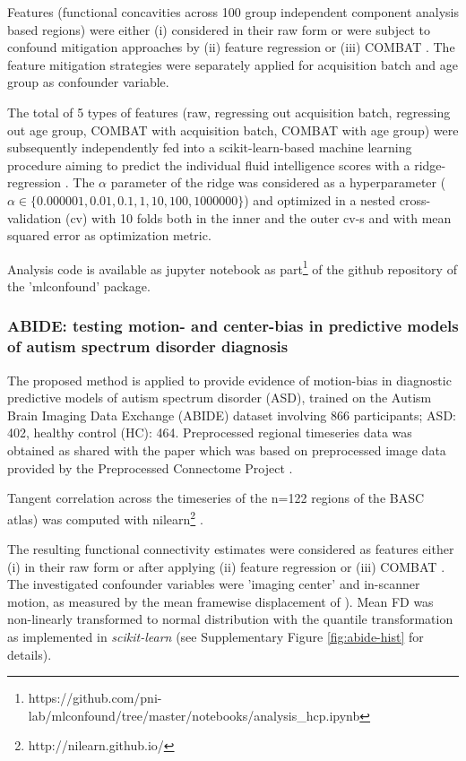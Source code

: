 \documentclass{article}
\begin{document}
Features (functional concavities across 100 group independent component analysis based regions) were either (i) considered in their raw form or were subject to confound mitigation approaches by (ii) feature regression \citep{rao2017predictive} or (iii) COMBAT \citep{johnson2007adjusting, fortin2018harmonization}.
The feature mitigation strategies were separately applied for acquisition batch and age group as confounder variable.

The total of 5 types of features (raw, regressing out acquisition batch, regressing out age group, COMBAT with acquisition batch, COMBAT with age group) were subsequently independently fed into a scikit-learn-based \citep{pedregosa2011scikit} machine learning procedure aiming to predict the individual fluid intelligence scores with a ridge-regression \citep{hoerl1970ridge}. The $\alpha$ parameter of the ridge was considered as a hyperparameter ($\alpha \in \{0.000001, 0.01, 0.1, 1, 10, 100, 1000000\}$) and optimized in a nested cross-validation (cv) with 10 folds both in the inner and the outer cv-s and with mean squared error as optimization metric.

Analysis code is available as jupyter notebook as part\footnote{https://github.com/pni-lab/mlconfound/tree/master/notebooks/analysis\_hcp.ipynb} of the github repository of the 'mlconfound' package.


\subsubsection*{ABIDE: testing motion- and center-bias in predictive models of autism spectrum disorder diagnosis}

The proposed method is applied to provide evidence of motion-bias in diagnostic predictive models of autism spectrum disorder (ASD), trained on the Autism Brain Imaging Data Exchange (ABIDE) dataset \citep{di2014autism} involving 866 participants; ASD: 402, healthy control (HC): 464. Preprocessed regional timeseries data was obtained as shared with the paper \citep{dadi2019benchmarking} which was based on preprocessed image data provided by the Preprocessed Connectome Project \citep{craddock2013neuro}.

Tangent correlation across the timeseries of the n=122 regions of the BASC \citep{bellec2010multi} atlas) was computed with nilearn\footnote{http://nilearn.github.io/} \citep{huntenburg2017loading, esteve2015big}. 

The resulting functional connectivity estimates were considered as features either (i) in their raw form or after applying (ii) feature regression \citep{rao2017predictive} or (iii) COMBAT \citep{johnson2007adjusting, fortin2018harmonization}.
The investigated confounder variables were 'imaging center' and in-scanner motion, as measured by the mean framewise displacement of \cite{power2014methods}).
Mean FD was non-linearly transformed to normal distribution with the quantile transformation \citep{beasley2009rank} as implemented in \emph{scikit-learn} \citep{pedregosa2011scikit} (see Supplementary Figure \ref{fig:abide-hist} for details).
\end{document}
